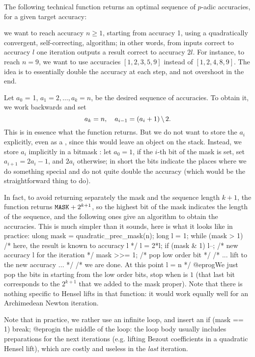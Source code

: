 The following technical function returns an optimal sequence of $p$-adic
accuracies, for a given target accuracy:

 we want to reach accuracy
$n\geq 1$, starting from accuracy 1, using a quadratically convergent,
self-correcting, algorithm; in other words, from inputs correct to accuracy
$l$ one iteration outputs a result correct to accuracy $2l$.
For instance, to reach $n = 9$, we want to use accuracies
$[1,2,3,5,9]$ instead of $[1,2,4,8,9]$. The idea is to essentially double
the accuracy at each step, and not overshoot in the end.

Let $a_0$ = 1, $a_1 = 2, \ldots, a_k = n$, be the desired sequence of
accuracies. To obtain it, we work backwards and set
$$ a_k = n,\quad a_{i-1} = (a_i + 1)\,\bs\, 2.$$
This is in essence what the function returns.
But we do not want to store the $a_i$ explicitly, even as a ,
since this would leave an object on the stack. Instead, we store $a_i$
implicitly in a bitmask : let $a_0 = 1$, if the $i$-th bit of the
mask is set, set $a_{i+1} = 2a_i - 1$, and $2a_i$ otherwise; in short the
bits indicate the places where we do something special and do not quite
double the accuracy (which would be the straightforward thing to do).

In fact, to avoid returning separately the mask and the sequence length
$k+1$, the function returns ${\tt MASK} + 2^{k+1}$, so the highest bit of
the mask indicates the length of the sequence, and the following ones give
an algorithm to obtain the accuracies. This is much simpler than it sounds,
here is what it looks like in practice:
\bprog
  ulong mask = quadratic_prec_mask(n);
  long l = 1;
  while (mask > 1) {            /* here, the result is known to accuracy l */
    l = 2*l; if (mask & 1) l--; /* new accuracy l for the iteration */
    mask >>= 1;                 /* pop low order bit */
    /* ... lift to the new accuracy ... */
  }
  /* we are done. At this point l = n */
@eprog\noindent We just pop the bits in  starting from the low
order bits, stop when  is $1$ (that last bit corresponds to the
$2^{k+1}$ that we added to the mask proper). Note that there is nothing
specific to Hensel lifts in that function: it would work equally well for
an Archimedean Newton iteration.

Note that in practice, we rather use an infinite loop, and insert an
\bprog
  if (mask == 1) break;
@eprog\noindent in the middle of the loop: the loop body usually includes
preparations for the next iterations (e.g. lifting Bezout coefficients
in a quadratic Hensel lift), which are costly and useless in the \emph{last}
iteration.

